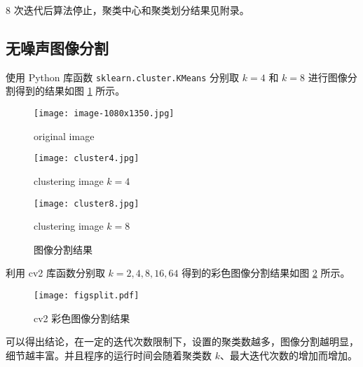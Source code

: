 \documentclass[12pt,AutoFakeBold]{article}
\begin{document}
$8$ 次迭代后算法停止，聚类中心和聚类划分结果见附录。

\subsection{无噪声图像分割}

使用 Python 库函数 \lstinline[language=Python]|sklearn.cluster.KMeans| 分别取 $k=4$ 和 $k=8$ 进行图像分割得到的结果如图 \ref{fig:figsplit1} 所示。

\begin{figure}[htbp]
	\centering
	\begin{minipage}[t]{0.32\textwidth}
		\centering
		\texttt{[image: image-1080x1350.jpg]}
		\caption*{original image}
	\end{minipage}
	\begin{minipage}[t]{0.32\textwidth}
		\centering
		\texttt{[image: cluster4.jpg]}
		\caption*{clustering image $k=4$}
	\end{minipage}
	\begin{minipage}[t]{0.32\textwidth}
		\centering
		\texttt{[image: cluster8.jpg]}
		\caption*{clustering image $k=8$}
	\end{minipage}
	\caption{图像分割结果} \label{fig:figsplit1}
\end{figure}

利用 cv2 库函数分别取 $k=2,4,8,16,64$ 得到的彩色图像分割结果如图 \ref{fig:figsplit2} 所示。

\begin{figure}[htbp]
	\centering
    \texttt{[image: figsplit.pdf]}
    \caption{cv2 彩色图像分割结果} \label{fig:figsplit2}
\end{figure}

可以得出结论，在一定的迭代次数限制下，设置的聚类数越多，图像分割越明显，细节越丰富。并且程序的运行时间会随着聚类数 $k$、最大迭代次数的增加而增加。

\newpage



\end{document}

